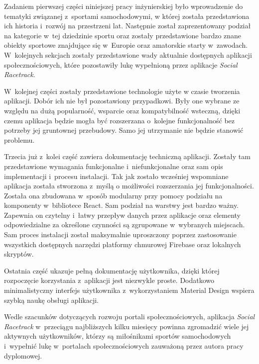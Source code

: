 \documentclass[../Kamil_Kowalewski_Main.tex]{subfiles}
\begin{document}
 {

    Zadaniem pierwszej części niniejszej pracy inżynierskiej było wprowadzenie do
    tematyki związanej z~sportami samochodowymi, w której została przedstawiona ich
    historia i~rozwój na przestrzeni lat. Następnie został zaprezentowany podział na
    kategorie w~tej dziedzinie sportu oraz zostały przedstawione bardzo znane obiekty
    sportowe znajdujące się w~Europie oraz amatorskie starty w~zawodach.
    W~kolejnych sekcjach zostały przedstawione wady aktualnie dostępnych aplikacji
    społecznościowych, które pozostawiły lukę wypełnioną przez aplikacje
    \textit{Social Racetrack}.

    W~kolejnej części zostały przedstawione technologie użyte w czasie tworzenia
    aplikacji. Dobór ich nie był pozostawiony przypadkowi. Były one wybrane ze względu
    na dużą popularność, wsparcie oraz kompatybilność wsteczną, dzięki czemu aplikacja
    będzie mogła być rozszerzana o~kolejne funkcjonalność bez potrzeby jej gruntownej
    przebudowy. Samo jej utrzymanie nie będzie stanowić problemu.

    Trzecia już z~kolei część zawiera dokumentację techniczną aplikacji. Zostały tam
    przedstawione wymagania funkcjonalne i~niefunkcjonalne oraz sam opis implementacji
    i~procesu instalacji. Tak jak zostało wcześniej wspomniane aplikacja została
    stworzona z~myślą o możliwości rozszerzania jej funkcjonalności. Została ona
    zbudowana w~sposób modularny przy pomocy podziału na komponenty w~bibliotece React.
    Sam podział na warstwy jest bardzo ważny. Zapewnia on czytelny i~łatwy przepływ
    danych przez aplikacje oraz elementy odpowiedzialne za określone czynności są
    zgrupowane w~wybranych miejscach. Sam proces instalacji został maksymalnie
    uproszczony poprzez zastosowanie wszystkich dostępnych narzędzi platformy chmurowej
    Firebase oraz lokalnych skryptów.

    Ostatnia część ukazuje pełną dokumentację użytkownika, dzięki której rozpoczęcie
    korzystania z~aplikacji jest niezwykle proste. Dodatkowo minimalistyczny interfejs
    użytkownika z~wykorzystaniem Material Design wspiera szybką naukę obsługi aplikacji.

    Wedle szacunków dotyczących rozwoju portali społecznościowych, aplikacja
    \textit{Social Racetrack} w~przeciągu najbliższych kilku miesięcy powinna zgromadzić
    wiele jej aktywnych użytkowników, którzy są miłośnikami sportów samochodowych
    i~wypełnić lukę w~portalach społecznościowych zauważoną przez autora pracy dyplomowej.
}
\end{document}
